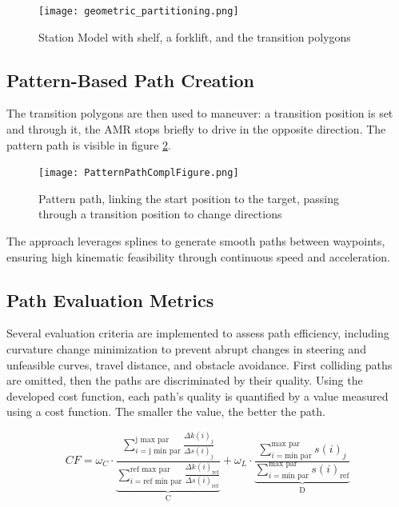 \documentclass{amam}                %
\begin{document}
\begin{figure}[t]
  \centering \texttt{[image: geometric\_partitioning.png]}
  \caption{Station Model with shelf, a forklift, and the transition polygons \cite{ref2}}
  \label{geometric_partitioning}
\end{figure}

\subsection{Pattern-Based Path Creation}
The transition polygons are then used to maneuver: a transition position is set and through it, the AMR stops briefly to drive in the opposite direction. The pattern path is visible in figure \ref{pattern path}.

\begin{figure}[t]
  \centering \texttt{[image: PatternPathComplFigure.png]}
  \caption{Pattern path, linking the start position to the target, passing through a transition position to change directions \cite{ref2}}
  \label{pattern path}
\end{figure}

The approach leverages splines to generate smooth paths between waypoints, ensuring high kinematic feasibility through continuous speed and acceleration.
\subsection{Path Evaluation Metrics}
Several evaluation criteria are implemented to assess path efficiency, including curvature change minimization to prevent abrupt changes in steering and unfeasible curves, travel distance, and obstacle avoidance. First colliding paths are omitted, then the paths are discriminated by their quality. Using the developed cost function, each path's quality is quantified by a value measured using a cost function. The smaller the value, the better the path.

\begin{equation}
    CF= \omega_{C} \cdot \underbrace{\frac{\sum_{i=\text{j min par}}^{\text{j max par}} 
    \frac{\Delta k(i)_j}{\Delta s(i)_j}}{\sum_{i=\text{ref min par}}^{\text{ref max par}} 
    \frac{\Delta k(i)_{\text{ref}}}{\Delta s(i)_{\text{ref}}}}}_{\text{C}} 
    + \omega_{L} \cdot \underbrace{\frac{\sum_{i=\text{min par}}^{\text{max par}} s(i)_j}
    {\sum_{i=\text{min par}}^{\text{max par}} s(i)_{\text{ref}}}}_{\text{D}}
    \label{Norm_function}
\end{equation}
\end{document}
